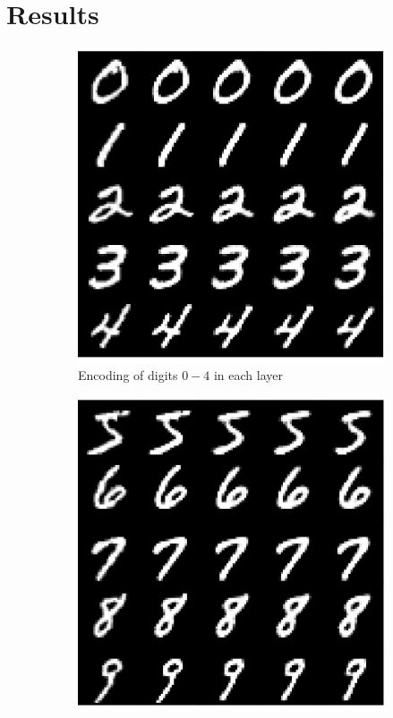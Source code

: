 \documentclass{article}
\begin{document}
\section{Results}\label{sec:results}



\begin{figure}[htbp!]
    \centering
    \begin{subfigure}{.45\textwidth}
        \centering
        \includegraphics[width=\textwidth]{incremental_0-4.png}
        \caption{Encoding of digits $0-4$ in each layer}
        \label{fig:incremental_0-4}
    \end{subfigure}%
    \quad
    \begin{subfigure}{.45\textwidth}
        \centering
        \includegraphics[width=\textwidth]{incremental_5-9.png}

\end{subfigure}
\end{figure}
\end{document}

